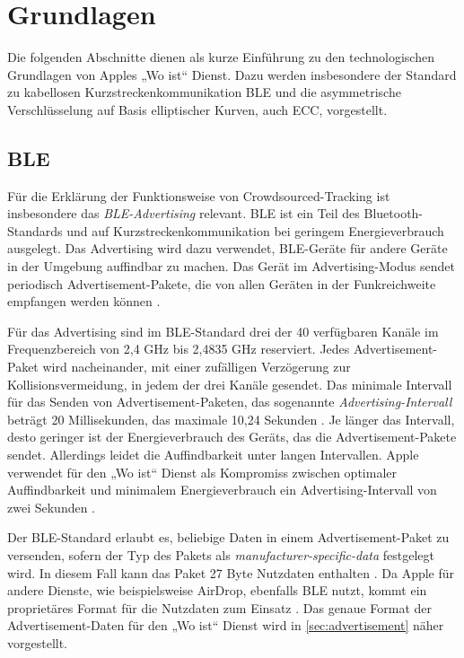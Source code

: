 \section{Grundlagen}
\label{sec:grundlagen}

Die folgenden Abschnitte dienen als kurze Einführung zu den technologischen Grundlagen von Apples „Wo ist“ Dienst.
Dazu werden insbesondere der Standard zu kabellosen Kurzstreckenkommunikation \ac{BLE} und die asymmetrische Verschlüsselung auf Basis elliptischer Kurven, auch \ac{ECC}, vorgestellt.

\subsection{\acf{BLE}}
\label{sec:ble}
Für die Erklärung der Funktionsweise von Crowdsourced-Tracking ist insbesondere das \textit{\ac{BLE}-Advertising} relevant.
\ac{BLE} ist ein Teil des Bluetooth-Standards und auf Kurzstreckenkommunikation bei geringem Energieverbrauch ausgelegt.
Das Advertising wird dazu verwendet, \ac{BLE}-Geräte für andere Geräte in der Umgebung auffindbar zu machen.
Das Gerät im Advertising-Modus sendet periodisch Advertisement-Pakete, die von allen Geräten in der Funkreichweite empfangen werden können \cite{Spec_BLE_5.3}.

Für das Advertising sind im \ac{BLE}-Standard drei der 40 verfügbaren Kanäle im Frequenzbereich von 2,4 GHz bis 2,4835 GHz reserviert.
Jedes Advertisement-Paket wird nacheinander, mit einer zufälligen Verzögerung zur Kollisionsvermeidung, in jedem der drei Kanäle gesendet.
Das minimale Intervall für das Senden von Advertisement-Paketen, das sogenannte \textit{Advertising-Intervall} beträgt 20 Millisekunden, das maximale 10,24 Sekunden \cite{Spec_BLE_5.3}.
Je länger das Intervall, desto geringer ist der Energieverbrauch des Geräts, das die Advertisement-Pakete sendet.
Allerdings leidet die Auffindbarkeit unter langen Intervallen.
Apple verwendet für den „Wo ist“ Dienst als Kompromiss zwischen optimaler Auffindbarkeit und minimalem Energieverbrauch ein Advertising-Intervall von zwei Sekunden \cite{Apple_FindMySpec}.


Der \ac{BLE}-Standard erlaubt es, beliebige Daten in einem Advertisement-Paket zu versenden, sofern der Typ des Pakets als \textit{manufacturer-specific-data} festgelegt wird.
In diesem Fall kann das Paket 27 Byte Nutzdaten enthalten \cite{Spec_BLE_5.3}.
Da Apple für andere Dienste, wie beispielsweise AirDrop, ebenfalls \ac{BLE} nutzt, kommt ein proprietäres Format für die Nutzdaten zum Einsatz \cite{Heinrich_FindMy}.
Das genaue Format der Advertisement-Daten für den „Wo ist“ Dienst wird in \autoref{sec:advertisement} näher vorgestellt.

